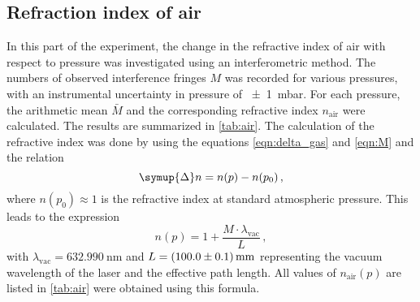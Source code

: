 \subsection{Refraction index of air}
\label{sec:air}
In this part of the experiment, the change in the refractive index of air with respect to pressure was investigated using an interferometric method. The numbers of observed interference fringes $M$ was recorded for various pressures, with an instrumental uncertainty in pressure of \SI{\pm1}{\milli\bar}. 
For each pressure, the arithmetic mean $\bar{M}$ and the corresponding refractive index $n_{\text{air}}$ were calculated. The results are summarized in \autoref{tab:air}.
The calculation of the refractive index was done by using the equations \ref{eqn:delta_gas} and \ref{eqn:M} and the relation
$$
    \symup{\Delta}n = n(p)-n(p_0)\,,
$$
where $n(p_0)\approx 1$ is the refractive index at standard atmospheric pressure. This leads to the expression
\begin{equation}
    n(p)= 1 + \frac{M\cdot \lambda_{\text{vac}}}{L}\,,\label{eqn:refraction_air}
\end{equation}
with $\lambda_{\text{vac}} = \SI{632.990}{\nano\meter}$ and $L=\SI{100.0\pm0.1}{\milli\meter}$ representing the vacuum wavelength of the laser and the effective path length. All values of $ n_{\text{air}}(p)$ are  listed in \autoref{tab:air} were obtained using this formula.
